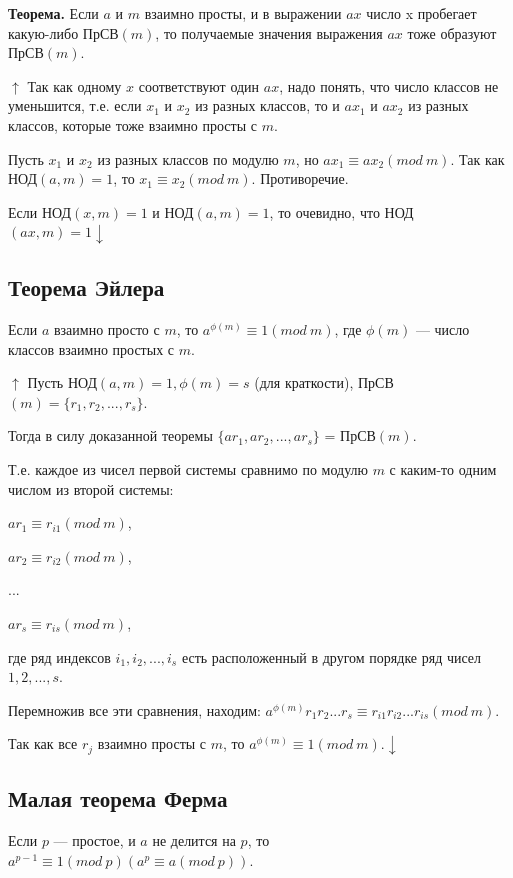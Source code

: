 \documentclass{article}
\begin{document}
        	\textbf{Теорема.} Если $a$ и $m$ взаимно просты, и в выражении $ax$ число x пробегает какую-либо ПрСВ$(m)$, то получаемые значения выражения $ax$ тоже образуют ПрСВ$(m)$.
            
            $\uparrow$ Так как одному $x$ соответствуют один $ax$, надо понять, что число классов не уменьшится, т.е. если $x_1$ и $x_2$ из разных классов, то и $ax_1$ и $ax_2$ из разных классов, которые тоже взаимно просты с $m$.
            
            Пусть $x_1$ и $x_2$ из разных классов по модулю $m$, но $ax_1 \equiv ax_2(mod\ m)$. Так как НОД$(a, m) = 1$, то $x_1 \equiv x_2(mod\ m)$. Противоречие.
            
            Если НОД$(x, m) = 1$ и НОД$(a, m) = 1$, то очевидно, что НОД$(ax, m) = 1 \downarrow$
        
        \subsection{Теорема Эйлера}
			Если $a$ взаимно просто с $m$, то $a^{\phi(m)} \equiv 1(mod\ m)$, где $\phi(m)$ --- число классов взаимно простых с $m$.
            
            $\uparrow$ Пусть НОД$(a, m) = 1, \phi(m) = s$ (для краткости), ПрСВ$(m)=\{r_1, r_2, ..., r_s\}$.
            
            Тогда в силу доказанной теоремы $\{ar_1, ar_2, ..., ar_s\}$ = ПрСВ$(m)$.
            
            Т.е. каждое из чисел первой системы сравнимо по модулю $m$ с каким-то одним числом из второй системы:
            
            $ar_1 \equiv r_{i1}(mod\ m)$,
            
            $ar_2 \equiv r_{i2}(mod\ m)$,
            
            ...
            
            $ar_s \equiv r_{is}(mod\ m)$,
            
            где ряд индексов $i_1, i_2, ..., i_s$ есть расположенный в другом порядке ряд чисел $1, 2, ..., s$.
            
            Перемножив все эти сравнения, находим: $a^{\phi(m)}r_1r_2...r_s \equiv r_{i1}r_{i2}...r_{is}(mod\ m)$.
            
            Так как все $r_j$ взаимно просты с $m$, то $a^{\phi(m)} \equiv 1(mod\ m). \downarrow$
            
        \subsection{Малая теорема Ферма}
        	Если $p$ --- простое, и $a$ не делится на $p$, то $a^{p-1} \equiv 1(mod\ p)(a^p \equiv a(mod\ p)).$      
            
\end{document}
